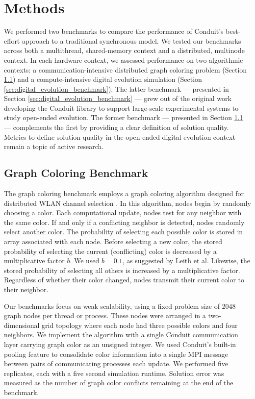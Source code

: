 \section{Methods}

We performed two benchmarks to compare the performance of Conduit's best-effort approach to a traditional synchronous model.
We tested our benchmarks across both a multithread, shared-memory context and a distributed, multinode context.
In each hardware context, we assessed performance on two algorithmic contexts: a communication-intensive distributed graph coloring problem (Section \ref{sec:graph_coloring_benchmark}) and a compute-intensive digital evolution simulation (Section \ref{sec:digital_evolution_benchmark}).
The latter benchmark --- presented in Section \ref{sec:digital_evolution_benchmark} --- grew out of the original work developing the Conduit library to support large-scale experimental systems to study open-ended evolution.
The former benchmark --- presented in Section \ref{sec:graph_coloring_benchmark} --- complements the first by providing a clear definition of solution quality.
Metrics to define solution quality in the open-ended digital evolution context remain a topic of active research.

\subsection{ Graph Coloring Benchmark } \label{sec:graph_coloring_benchmark}

The graph coloring benchmark employs a graph coloring algorithm designed for distributed WLAN channel selection \cite{leith2012wlan}.
In this algorithm, nodes begin by randomly choosing a color.
Each computational update, nodes test for any neighbor with the same color.
If and only if a conflicting neighbor is detected, nodes randomly select another color.
The probability of selecting each possible color is stored in array associated with each node.
Before selecting a new color, the stored probability of selecting the current (conflicting) color is decreased by a multiplicative factor $b$.
We used $b=0.1$, as suggested by Leith et al.
Likewise, the stored probability of selecting all others is increased by a multiplicative factor.
Regardless of whether their color changed, nodes transmit their current color to their neighbor.

Our benchmarks focus on weak scalability, using a fixed problem size of 2048 graph nodes per thread or process.
These nodes were arranged in a two-dimensional grid topology where each node had three possible colors and four neighbors.
We implement the algorithm with a single Conduit communication layer carrying graph color as an unsigned integer.
We used Conduit's built-in pooling feature to consolidate color information into a single MPI message between pairs of communicating processes each update. 
We performed five replicates, each with a five second simulation runtime.
Solution error was measured as the number of graph color conflicts remaining at the end of the benchmark. 

